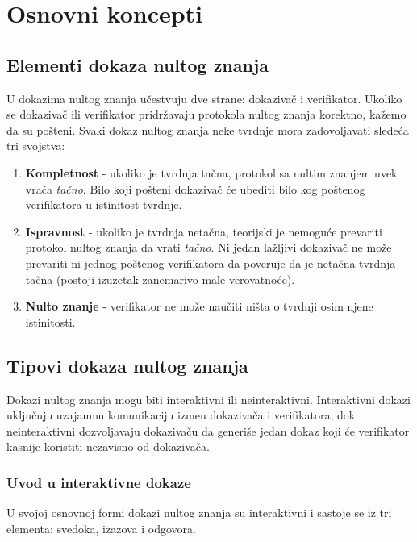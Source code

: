 \chapter{Osnovni koncepti}

\section{Elementi dokaza nultog znanja} %
U dokazima nultog znanja u\v cestvuju dve strane: dokaziva\v c i verifikator. Ukoliko se dokaziva\v c ili verifikator pridr\v zavaju protokola nultog znanja korektno, ka\v zemo da su po\v steni. Svaki dokaz nultog znanja neke tvrdnje mora zadovoljavati slede\' ca tri svojstva:
\begin{enumerate}
	\item \textbf{Kompletnost} - ukoliko je  tvrdnja ta\v cna, protokol sa nultim znanjem uvek vra\' ca {\it ta\v cno}. Bilo koji po\v steni dokaziva\v c \' ce ubediti bilo kog po\v stenog verifikatora u istinitost tvrdnje.
	\item \textbf{Ispravnost} - ukoliko je  tvrdnja neta\v cna, teorijski je nemogu\' ce prevariti protokol nultog znanja da vrati {\it ta\v cno}. Ni jedan la\v zljivi dokaziva\v c ne mo\v ze prevariti ni jednog po\v stenog verifikatora da poveruje da je neta\v cna tvrdnja ta\v cna (postoji izuzetak zanemarivo male verovatno\' ce).
	\item \textbf{Nulto znanje} - verifikator ne mo\v ze nau\v citi ni\v sta o tvrdnji osim njene istinitosti.
\end{enumerate}

\section{Tipovi dokaza nultog znanja}
Dokazi nultog znanja mogu biti interaktivni ili neinteraktivni. Interaktivni dokazi uklju\v cuju uzajamnu komunikaciju izme\dj u dokaziva\v ca i verifikatora, dok neinteraktivni dozvoljavaju dokaziva\v cu da generi\v se jedan dokaz koji \' ce verifikator kasnije koristiti nezavisno od dokaziva\v ca.

\subsection{Uvod u interaktivne dokaze}
U svojoj osnovnoj formi dokazi nultog znanja su interaktivni i sastoje se iz tri elementa: svedoka, izazova i odgovora.

